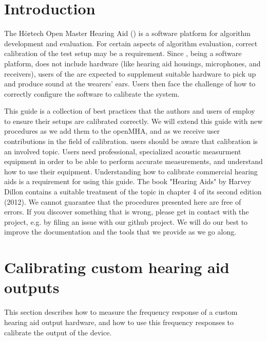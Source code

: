 \documentclass[11pt,a4paper,twoside]{article}
\newcommand{\+}{\discretionary{\mbox{\scriptsize$\hookleftarrow$}}{}{}}
\begin{document}
\newpage
\MHAcopyright{}
\newpage
\tableofcontents
\newpage
\renewcommand{\leftmark}{\rightmark}

\section{Introduction}

The H\"{o}rtech Open Master Hearing Aid (\mha{}) is a software platform
for algorithm development and evaluation.
%
For certain aspects of algorithm evaluation, correct calibration of the
test setup may be a requirement.
%
Since \mha{}, being a software platform, does not include hardware
(like hearing aid housings, microphones, and receivers),
users of the \mha{} are expected to supplement suitable hardware
to pick up and produce sound at the wearers' ears.
%
Users then face the challenge of how to correctly configure the software
to calibrate the system.

This guide is a collection of best practices that the authors and users
of \mha{} employ to ensure their setups are calibrated correctly.
%
We will extend this guide with new procedures as we add them to the
openMHA, and as we receive user contributions in the field of
calibration.
%
\mha{} users should be aware that calibration is an involved topic.
%
Users need professional, specialized acoustic measurment equipment in
order to be able to perform accurate measurements, and understand
how to use their equipment.
%
Understanding how to calibrate commercial hearing aids is a requirement
for using this guide.
%
The book "Hearing Aids" by Harvey Dillon contains a suitable treatment
of the topic in chapter 4 of its second edition (2012).
%
We cannot guarantee that the procedures presented here are free of
errors.
%
If you discover something that is wrong, please get in contact with
the \mha{} project, e.g. by filing an issue with our github project.
%
We will do our best to improve the documentation and the tools that we
provide as we go along.

\section{Calibrating custom hearing aid outputs}

This section describes how to measure the frequency response of a
custom hearing aid output hardware, and how to use this frequency
responses to calibrate the output of the device.

%
\end{document}
